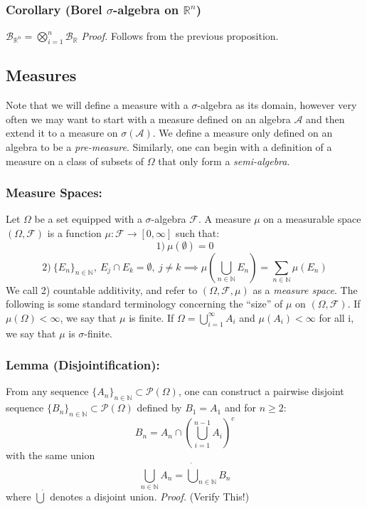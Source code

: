 \documentclass{article}
\begin{document}
\subsubsection{Corollary (Borel $\sigma$-algebra on $\mathbb{R}^n$)}
$\mathcal{B}_{\mathbb{R}^n}=\bigotimes_{i=1}^n\mathcal{B}_{\mathbb{R}}$\newline \newline
\textit{Proof.}\newline \newline
Follows from the previous proposition.

\subsection{Measures}
Note that we will define a measure with a $\sigma$-algebra as its domain, however very often we may want to start with a measure defined on an algebra $\mathcal{A}$ and then extend it to a measure on $\sigma(\mathcal{A})$. We define a measure only defined on an algebra to be a \emph{pre-measure}. Similarly, one can begin with a definition of a measure on a class of subsets of $\Omega$ that only form a \emph{semi-algebra}.

\subsubsection{Measure Spaces:} Let $\Omega$ be a set equipped with a $\sigma$-algebra $\mathcal{F}$. A measure $\mu$ on a measurable space $(\Omega, \mathcal{F})$ is a function $\mu: \mathcal{F} \to [0, \infty]$ such that:
\[
1) \ \mu(\emptyset) = 0
\]
\[
2) \ \{E_n\}_{n \in \mathbb{N}}, \ E_j \cap E_k =\emptyset, \ j\neq k \implies \mu(\bigcup_{n\in \mathbb{N}}E_n) = \sum_{n \in \mathbb{N}}\mu(E_n)
\]
We call 2) countable additivity, and refer to  $(\Omega, \mathcal{F}, \mu)$ as a \emph{measure space}. \newline \newline
The following is some standard terminology concerning the ``size'' of $\mu$ on $(\Omega,\mathcal{F})$. If $\mu(\Omega)<\infty$, we say that $\mu$ is finite. If $\Omega = \bigcup_{i=1}^{\infty}A_i$ and $\mu(A_i)< \infty$ for all i, we say that $\mu$ is $\sigma$-finite.  \newline \newline

\subsubsection{Lemma (Disjointification):} From any sequence $\{A_n\}_{n \in \mathbb{N}} \subset \mathcal{P}(\Omega)$, one can construct a pairwise disjoint sequence $\{B_n\}_{n \in \mathbb{N}} \subset \mathcal{P}(\Omega)$ defined by $B_1=A_1$ and for $n \geq 2:$
\[
B_n = A_n \cap (\bigcup_{i=1}^{n-1}A_i)^c
\]
with the same union 
\[
\bigcup_{n \in \mathbb{N}}A_n = \dot{\bigcup}_{n\in \mathbb{N}}B_n
\]
where $\dot{\bigcup}$ denotes a disjoint union.\newline \newline
\textit{Proof.} \newline \newline
(Verify This!)
\end{document}
